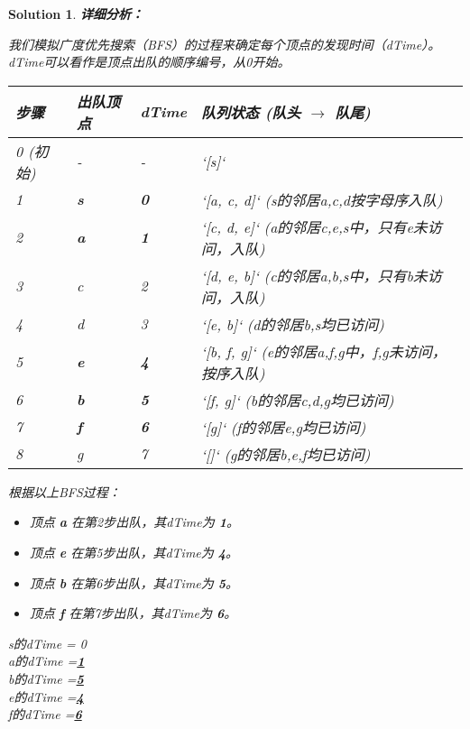 \documentclass[UTF8]{report}
\newtheorem{solution}{Solution}
\theoremstyle{MyLineTheoremStyle} %
\theoremstyle{MyBlockTheoremStyle} %
\theoremstyle{MySubsubsectionStyle} %
\begin{document}
\begin{solution}
\textbf{详细分析：}

我们模拟广度优先搜索（BFS）的过程来确定每个顶点的发现时间（dTime）。dTime可以看作是顶点出队的顺序编号，从0开始。

\begin{table}[h!]
\centering
\begin{tabular}{|l|l|l|l|}
\hline
\textbf{步骤} & \textbf{出队顶点} & \textbf{dTime} & \textbf{队列状态 (队头 \(\to\) 队尾)} \\ \hline
0 (初始) & - & - & `[s]` \\ \hline
1 & \textbf{s} & \textbf{0} & `[a, c, d]` (s的邻居a,c,d按字母序入队) \\ \hline
2 & \textbf{a} & \textbf{1} & `[c, d, e]` (a的邻居c,e,s中，只有e未访问，入队) \\ \hline
3 & c & 2 & `[d, e, b]` (c的邻居a,b,s中，只有b未访问，入队) \\ \hline
4 & d & 3 & `[e, b]` (d的邻居b,s均已访问) \\ \hline
5 & \textbf{e} & \textbf{4} & `[b, f, g]` (e的邻居a,f,g中，f,g未访问，按序入队) \\ \hline
6 & \textbf{b} & \textbf{5} & `[f, g]` (b的邻居c,d,g均已访问) \\ \hline
7 & \textbf{f} & \textbf{6} & `[g]` (f的邻居e,g均已访问) \\ \hline
8 & g & 7 & `[]` (g的邻居b,e,f均已访问) \\ \hline
\end{tabular}
\end{table}

根据以上BFS过程：
\begin{itemize}
    \item 顶点 \textbf{a} 在第2步出队，其dTime为 \textbf{1}。
    \item 顶点 \textbf{e} 在第5步出队，其dTime为 \textbf{4}。
    \item 顶点 \textbf{b} 在第6步出队，其dTime为 \textbf{5}。
    \item 顶点 \textbf{f} 在第7步出队，其dTime为 \textbf{6}。
\end{itemize}

\hrulefill

s的dTime = 0\\
a的dTime =\underline{\hspace{2cm}\textbf{1}\hspace{2cm}}\\
b的dTime =\underline{\hspace{2cm}\textbf{5}\hspace{2cm}}\\
e的dTime =\underline{\hspace{2cm}\textbf{4}\hspace{2cm}}\\
f的dTime =\underline{\hspace{2cm}\textbf{6}\hspace{2cm}}
\end{solution}
\end{document}
